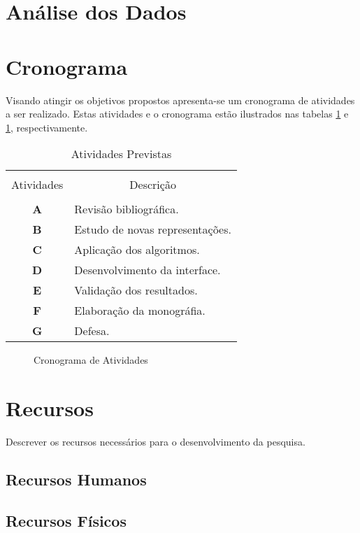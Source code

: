 \section{Análise dos Dados}


\section{Cronograma}
Visando atingir os objetivos propostos apresenta-se um cronograma
de atividades a ser realizado. Estas atividades e o cronograma
estão ilustrados nas tabelas \ref{tb:atividades} e
\ref{fig:cronograma}, respectivamente.


\begin{table}[!htb]
	\centering
	\caption{Atividades Previstas}\label{tb:atividades}
	\begin{tabular}{cp{12cm}}
		\hline \hline &\\[-0.4cm]
		Atividades& \multicolumn{1}{c}{ Descrição} \\
		\hline
		&\\[-0.4cm]
		\textbf{A} & Revisão bibliográfica. \\[0.2cm]
		\textbf{B} &  Estudo de novas representações.\\[0.2cm]
		\textbf{C} &  Aplicação dos algoritmos.\\[0.2cm]
		\textbf{D} &  Desenvolvimento da interface. \\[0.2cm]
		\textbf{E} &  Validação dos resultados.\\[0.2cm]
		\textbf{F} &  Elaboração da monográfia.\\[0.2cm]
		\textbf{G} &  Defesa.\\[0.2cm]
		\hline \hline
	\end{tabular}
\end{table}


\begin{figure}
	\caption{Cronograma de Atividades}\label{fig:cronograma}
	\begin{gantt}{10}{12}
		\begin{ganttitle}
		\end{ganttitle}
	\end{gantt}
	
\end{figure}
\section{Recursos}
Descrever os recursos necessários para o desenvolvimento da pesquisa.
\subsection{Recursos Humanos}
\subsection{Recursos Físicos}
